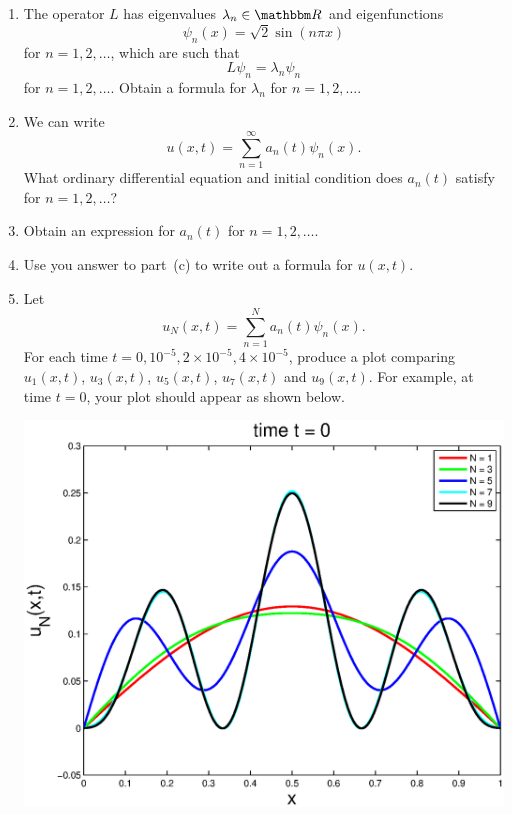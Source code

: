 \begin{enumerate}
\item The operator $L$ has eigenvalues $\lambda_n\in\R$ and eigenfunctions
\[
\psi_n(x) = \sqrt{2} \sin(n \pi x)
\]
for $n = 1,2,\ldots$, which are such that
\[
L\psi_n=\lambda_n\psi_n
\]
for $n = 1,2,\ldots$. Obtain a formula for $\lambda_n$ for $n = 1,2,\ldots$.
\\
\item We can write
\[
u(x,t)=\sum_{n=1}^\infty a_n(t)\psi_n(x).
\]
What ordinary differential equation and initial condition does $a_n(t)$ satisfy for $n = 1,2,\ldots$?
\\
\item Obtain an expression for $a_n(t)$ for $n=1,2,\ldots$.
\\
\item Use you answer to part~(c) to write out a formula for $u(x,t)$.
\\
\item Let
\[
u_N(x,t)=\sum_{n=1}^N a_n(t)\psi_n(x).
\]
For each time $t=0,10^{-5},2\times 10^{-5},4 \times 10^{-5}$, produce a plot comparing
$u_1(x,t)$, $u_3(x,t)$, $u_5(x,t)$, $u_7(x,t)$ and $u_9(x,t)$. For example, at time $t=0$, your plot should appear as shown below.

\begin{center}
\includegraphics[scale=0.5]{fourth_a}
\end{center}
\end{enumerate}


